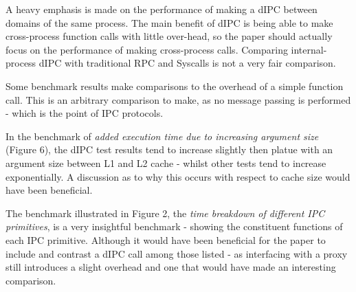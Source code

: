 \documentclass{article}
\begin{document}
A heavy emphasis is made on the performance of making a dIPC between domains of the same process. The main benefit of dIPC is being able to make cross-process function calls with little over-head, so the paper should actually focus on the performance of making cross-process calls. Comparing internal-process dIPC with traditional RPC and Syscalls is not a very fair comparison.

Some benchmark results make comparisons to the overhead of a simple function call. This is an arbitrary comparison to make, as no message passing is performed - which is the point of IPC protocols.

In the benchmark of \textit{added execution time due to increasing argument size} (Figure 6), the dIPC test results tend to increase slightly then platue with an argument size between L1 and L2 cache - whilst other tests tend to increase exponentially. A discussion as to why this occurs with respect to cache size would have been beneficial.

The benchmark illustrated in Figure 2, the \textit{time breakdown of different IPC primitives}, is a very insightful benchmark - showing the constituent functions of each IPC primitive. Although it would have been beneficial for the paper to include and contrast a dIPC call among those listed - as interfacing with a proxy still introduces a slight overhead and one that would have made an interesting comparison. 


\nocite{*}


\end{document}

